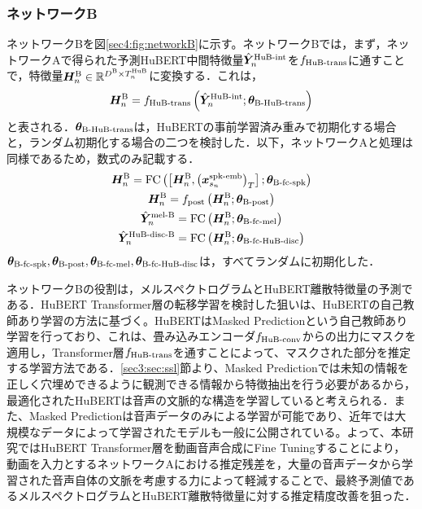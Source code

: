 \subsubsection{ネットワークB}
ネットワークBを図\ref{sec4:fig:networkB}に示す。ネットワークBでは，まず，ネットワークAで得られた予測HuBERT中間特徴量$\hat{\bm{Y}}^{\text{HuB-int}}_{n}$を$f_{\text{HuB-trans}}$に通すことで，特徴量$\bm{H}^{\text{B}}_{n} \in \mathbb{R}^{D^{\text{B}} \times T^{\text{HuB}}_{n}}$に変換する．これは，
\begin{equation}
    \bm{H}^{\text{B}}_{n} = f_{\text{HuB-trans}}\left(\hat{\bm{Y}}^{\text{HuB-int}}_{n}; \bm{\theta}_{\text{B-HuB-trans}}\right)
\end{equation}
と表される．$\bm{\theta}_{\text{B-HuB-trans}}$は，HuBERTの事前学習済み重みで初期化する場合と，ランダム初期化する場合の二つを検討した．以下，ネットワークAと処理は同様であるため，数式のみ記載する．
\begin{gather}
    \bm{H}^{\text{B}}_{n} = \text{FC}\left(\left[\bm{H}^{\text{B}}_{n}, \left(\bm{x}^{\text{spk-emb}}_{s_{n}}\right)_{T}\right]; \bm{\theta}_{\text{B-fc-spk}}\right) \\
    \bm{H}^{\text{B}}_{n} = f_{\text{post}}\left(\bm{H}^{\text{B}}_{n}; \bm{\theta}_{\text{B-post}}\right) \\
    \hat{\bm{Y}}^{\text{mel-B}}_{n} = \text{FC}\left(\bm{H}^{\text{B}}_{n}; \bm{\theta}_{\text{B-fc-mel}}\right) \\
    \hat{\bm{Y}}^{\text{HuB-disc-B}}_{n} = \text{FC}\left(\bm{H}^{\text{B}}_{n}; \bm{\theta}_{\text{B-fc-HuB-disc}}\right)
\end{gather}
$\bm{\theta}_{\text{B-fc-spk}}, \bm{\theta}_{\text{B-post}}, \bm{\theta}_{\text{B-fc-mel}}, \bm{\theta}_{\text{B-fc-HuB-disc}}$は，すべてランダムに初期化した．

ネットワークBの役割は，メルスペクトログラムとHuBERT離散特徴量の予測である．HuBERT Transformer層の転移学習を検討した狙いは、HuBERTの自己教師あり学習の方法に基づく。HuBERTはMasked Predictionという自己教師あり学習を行っており、これは、畳み込みエンコーダ$f_{\text{HuB-conv}}$からの出力にマスクを適用し，Transformer層$f_{\text{HuB-trans}}$を通すことによって、マスクされた部分を推定する学習方法である．\ref{sec3:sec:ssl}節より、Masked Predictionでは未知の情報を正しく穴埋めできるように観測できる情報から特徴抽出を行う必要があるから，最適化されたHuBERTは音声の文脈的な構造を学習していると考えられる．また、Masked Predictionは音声データのみによる学習が可能であり、近年では大規模なデータによって学習されたモデルも一般に公開されている。よって、本研究ではHuBERT Transformer層を動画音声合成にFine Tuningすることにより，動画を入力とするネットワークAにおける推定残差を，大量の音声データから学習された音声自体の文脈を考慮する力によって軽減することで、最終予測値であるメルスペクトログラムとHuBERT離散特徴量に対する推定精度改善を狙った．

